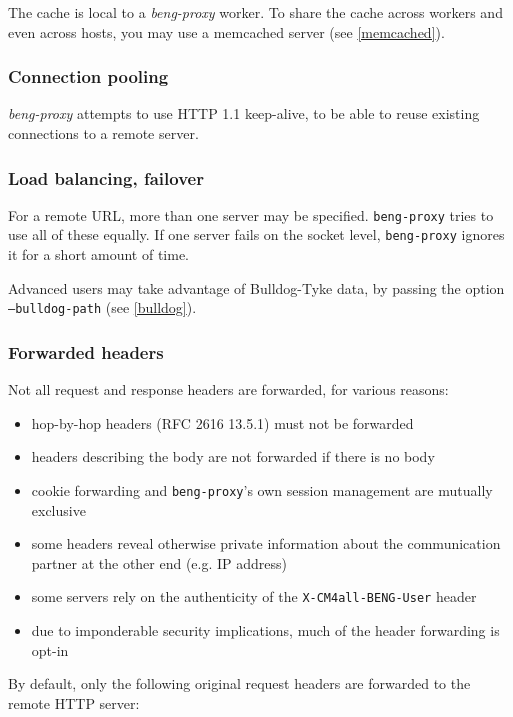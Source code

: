 \documentclass[a4paper,12pt]{article}
\begin{document}
The cache is local to a \emph{beng-proxy} worker.  To share the cache
across workers and even across hosts, you may use a memcached server
(see \ref{memcached}).

\subsubsection{Connection pooling}

\emph{beng-proxy} attempts to use HTTP 1.1 keep-alive, to be able to
reuse existing connections to a remote server.

\subsubsection{Load balancing, failover}
\label{balancing}

For a remote URL, more than one server may be specified.
\texttt{beng-proxy} tries to use all of these equally.  If one server
fails on the socket level, \texttt{beng-proxy} ignores it for a short
amount of time.

Advanced users may take advantage of Bulldog-Tyke data, by passing
the option \texttt{--bulldog-path} (see \ref{bulldog}).

\subsubsection{Forwarded headers}

Not all request and response headers are forwarded, for various
reasons:

\begin{itemize}
\item hop-by-hop headers (RFC 2616 13.5.1) must not be forwarded
\item headers describing the body are not forwarded if there is no
  body
\item cookie forwarding and \texttt{beng-proxy}'s own session
  management are mutually exclusive
\item some headers reveal otherwise private information about the
  communication partner at the other end (e.g. IP address)
\item some servers rely on the authenticity of the
  \texttt{X-CM4all-BENG-User} header
\item due to imponderable security implications, much of the header
  forwarding is opt-in
\end{itemize}

By default, only the following original request headers are forwarded
to the remote HTTP server:
\end{document}
